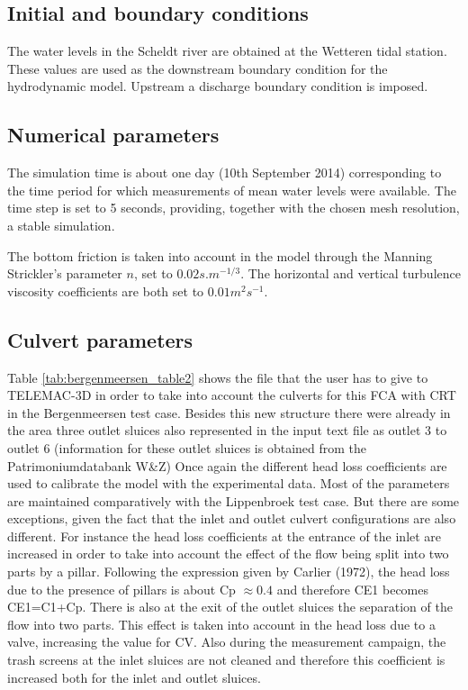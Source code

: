 \subsection{Initial and boundary conditions}
The water levels in the Scheldt river are obtained at the Wetteren tidal station.
These values are used as the downstream boundary condition for the hydrodynamic model.
Upstream a discharge boundary condition is imposed.
%
\subsection{Numerical parameters}
The simulation time is about one day (10th September 2014) corresponding to the time period
for which measurements of mean water levels were available.
The time step is set to 5 seconds, providing, together with the chosen mesh resolution, a stable simulation.

The bottom friction is taken into account in the model through the Manning Strickler’s parameter $n$, set to $0.02 s.m^{-1/3}$.
The horizontal and vertical turbulence viscosity coefficients are both set to $0.01 m^2s^{-1}$.

\subsection{Culvert parameters}
Table \ref{tab:bergenmeersen_table2} shows the file that the user has to give to TELEMAC-3D in order to take
into account the culverts for this FCA with CRT in the Bergenmeersen test case.
Besides this new structure there were already in the area three outlet sluices
also represented in the input text file as outlet 3 to outlet 6
(information for these outlet sluices is obtained from the Patrimoniumdatabank W\&Z)
Once again the different head loss coefficients are used to calibrate the model
with the experimental data.
Most of the parameters are maintained comparatively with the Lippenbroek test case.
But there are some exceptions, given the fact that the inlet and outlet culvert configurations are also different.
For instance the head loss coefficients at the entrance of the inlet are increased in order to take
into account the effect of the flow being split into two parts by a pillar.
Following the expression given by Carlier (1972), the head loss due to the presence of pillars is about Cp $\approx 0.4$
and therefore CE1 becomes CE1=C1+Cp.
There is also at the exit of the outlet sluices the separation of the flow into two parts.
This effect is taken into account in the head loss due to a valve, increasing the value for CV.
Also during the measurement campaign, the trash screens at the inlet sluices are
not cleaned and therefore this coefficient is increased both for the inlet and outlet sluices.

